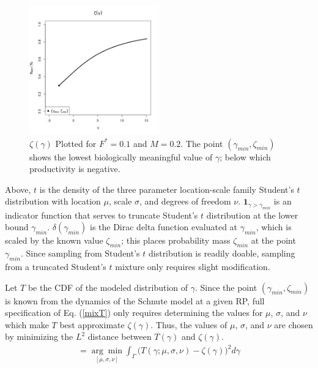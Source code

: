 \documentclass[12pt]{article}
\begin{document}
%

%
\begin{figure}
\vspace*{-1cm}
\includegraphics[width=0.5\textwidth]{../gpBias/zeta.png}
\vspace*{-1.3cm}
\caption{$\zeta(\gamma)$ Plotted for $F^*=0.1$ and $M=0.2$. The point 
$(\gamma_{min}, \zeta_{min})$ shows the lowest biologically meaningful 
value of $\gamma$; below which productivity is negative.}
\end{figure}
 
%
Above, $t$ is the density of the three parameter location-scale family Student's $t$ 
distribution with location $\mu$, scale $\sigma$, and degrees of freedom $\nu$. 
$\bm{1}_{\gamma>\gamma_{min}}$ is an indicator function that serves to truncate 
Student's $t$ distribution at the lower bound $\gamma_{min}$. 
$\delta(\gamma_{min})$ is the Dirac delta function evaluated at $\gamma_{min}$, 
which is scaled by the known value $\zeta_{min}$; this places probability mass 
$\zeta_{min}$ at the point $\gamma_{min}$. Since sampling from Student's $t$ 
distribution is readily doable, sampling from a truncated Student's $t$ mixture 
only requires slight modification. 

Let $T$ be the CDF of the modeled distribution of $\gamma$. Since the point 
$(\gamma_{min}, \zeta_{min})$ is known from the dynamics of the Schnute model 
at a given RP, full specification of Eq. (\ref{mixT}) only requires determining 
the values for $\mu$, $\sigma$, and $\nu$ which make $T$ best approximate 
$\zeta(\gamma)$. Thus, the values of $\mu$, $\sigma$, and $\nu$ are chosen by 
minimizing the $L^2$ distance between $T(\gamma)$ and $\zeta(\gamma)$.
\begin{align}
[\hat\mu, \hat\sigma, \hat\nu]=\underset{{[\mu, \sigma, \nu]}}{\arg\min}\int_\Gamma \big(T(\gamma; \mu, \sigma, \nu) - \zeta(\gamma)\big)^2 d\gamma
\end{align}  
\end{document}
